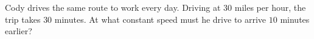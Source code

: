 Cody drives the same route to work every day. Driving at $30$ miles per hour, the trip takes $30$ minutes. At what constant speed must he drive to arrive $10$ minutes earlier?
